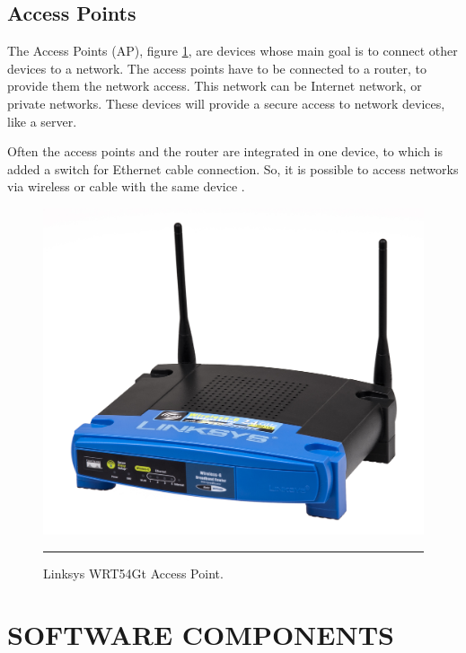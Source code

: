 \documentclass[12pt, a4paper,twoside]{tesi_upf}
\begin{document}
        \subsection{Access Points}
        The Access Points (AP), figure \ref{fig:ap}, are devices whose main goal is to connect other devices to a network. The access points have to be connected to a router, to provide them the network access. This network can be Internet network, or private networks. These devices will provide a secure access to network devices, like a server. 

        Often the access points and the router are integrated in one device, to which is added a switch for Ethernet cable connection. So, it is possible to access networks via wireless or cable with the same device \cite{ap}.
        
        
         \begin{figure}[htbp]
          \centering
              \includegraphics[scale=0.1]{./figures/Ap.png}
              \rule{32em}{0.5pt}
          \caption[Access Point]{Linksys WRT54Gt Access Point.}
          \label{fig:ap}
        \end{figure}
    
    \section{SOFTWARE COMPONENTS}
    
\end{document}
